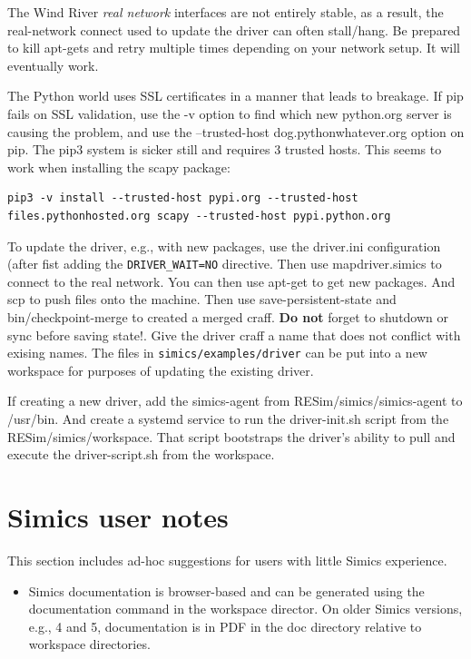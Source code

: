 \documentclass[titlepage]{article}
\begin{document}
\begin{appendices}
The Wind River \textit{real network} interfaces are not entirely stable, as a result, the real-network connect used to update the driver can often stall/hang.
Be prepared to kill apt-gets and retry multiple times depending on your network setup.  It will eventually work.

The Python world uses SSL certificates in a manner that leads to breakage.  If pip fails on SSL validation, use the -v option
to find which new python.org server is causing the problem, and use the --trusted-host dog.pythonwhatever.org option on pip.
The pip3 system is sicker still and requires 3 trusted hosts.  This seems to work when installing the scapy package:
\begin{verbatim}
pip3 -v install --trusted-host pypi.org --trusted-host files.pythonhosted.org scapy --trusted-host pypi.python.org
\end{verbatim}

To update the driver, e.g., with new packages, use the driver.ini configuration (after fist adding the {\tt DRIVER\_WAIT=NO} directive.  Then use mapdriver.simics to connect to the real network.
You can then use apt-get to get new packages.  And scp to push files onto the machine.  Then use save-persistent-state and bin/checkpoint-merge to
created a merged craff.  \textbf{Do not} forget to shutdown or sync before saving state!.  Give the driver craff a name that does not conflict with exising names.
The files in {\tt simics/examples/driver} can be put into a new workspace for purposes of updating the existing driver.

If creating a new driver, add the simics-agent from RESim/simics/simics-agent to /usr/bin.  And create a systemd service to run the
driver-init.sh script from the RESim/simics/workspace.  That script bootstraps the driver's ability to pull
and execute the driver-script.sh from the workspace.

\section{Simics user notes}
This section includes ad-hoc suggestions for users with little Simics experience.
\begin{itemize}
\item Simics documentation is browser-based and can be generated using the documentation command in the workspace director.  On older Simics versions,
e.g., 4 and 5, documentation is in PDF in the doc directory relative to workspace directories.


\end{itemize}
\end{appendices}
\end{document}
